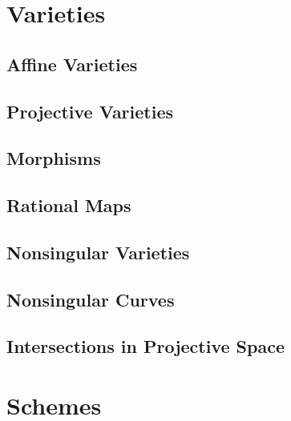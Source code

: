 \documentclass[11pt, a4paper]{article}
\title{\notestitle}
\author{\notesauthor}
\date{\notesdate}
\begin{document}
\maketitle
\tableofcontents
\newpage

\section{Varieties}

\subsection{Affine Varieties}

\subsection{Projective Varieties}

\subsection{Morphisms}

\subsection{Rational Maps}

\subsection{Nonsingular Varieties}

\subsection{Nonsingular Curves}

\subsection{Intersections in Projective Space}

\section{Schemes}
\end{document}
